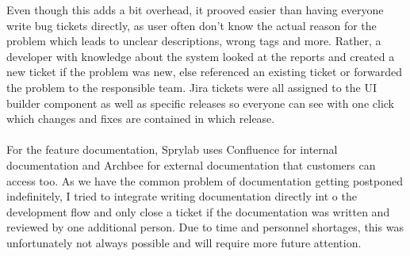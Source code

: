 Even though this adds a bit overhead, it prooved easier than having everyone write bug tickets directly, as user often don't know the actual reason for the problem which leads to unclear descriptions, wrong tags and more.
Rather, a developer with knowledge about the system looked at the reports and created a new ticket if the problem was new, else referenced an existing ticket or forwarded the problem to the responsible team.
Jira tickets were all assigned to the UI builder component as well as specific releases so everyone can see with one click which changes and fixes are contained in which release.
\\\\
For the feature documentation, Sprylab uses Confluence for internal documentation and Archbee for external documentation that customers can access too.
As we have the common problem of documentation getting postponed indefinitely, I tried to integrate writing documentation directly int o the development flow and only close a ticket if the documentation
was written and reviewed by one additional person. Due to time and personnel shortages, this was unfortunately not always possible and will require more future attention.


